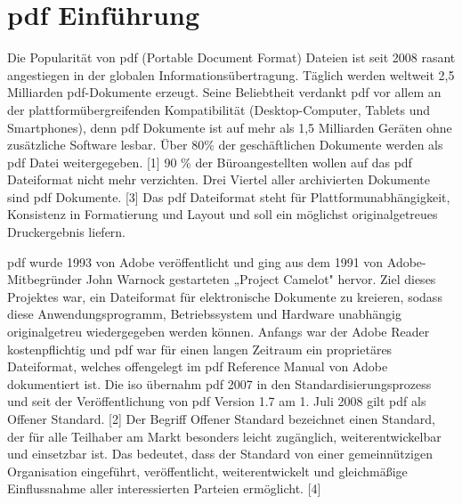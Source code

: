 \section{\gls{pdf} Einführung}
Die Popularität von \gls{pdf} (Portable Document Format) Dateien ist seit 2008 rasant angestiegen in der globalen Informationsübertragung. Täglich werden weltweit 2,5 Milliarden \gls{pdf}-Dokumente erzeugt. Seine Beliebtheit verdankt \gls{pdf} vor allem an der plattformübergreifenden Kompatibilität (Desktop-Computer, Tablets und Smartphones), denn \gls{pdf} Dokumente ist auf mehr als 1,5 Milliarden Geräten ohne zusätzliche Software lesbar. Über 80\% der geschäftlichen Dokumente werden als \gls{pdf} Datei weitergegeben. [1] 90 \% der Büroangestellten wollen auf das \gls{pdf} Dateiformat nicht mehr verzichten. Drei Viertel aller archivierten Dokumente sind \gls{pdf} Dokumente. [3] Das \gls{pdf} Dateiformat steht für Plattformunabhängigkeit, Konsistenz in Formatierung und Layout und soll ein möglichst originalgetreues Druckergebnis liefern.
\par
\gls{pdf} wurde 1993 von Adobe veröffentlicht und ging aus dem 1991 von Adobe-Mitbegründer John Warnock gestarteten „Project Camelot" hervor. Ziel dieses Projektes war, ein Dateiformat für elektronische Dokumente zu kreieren, sodass diese Anwendungsprogramm, Betriebssystem und Hardware unabhängig originalgetreu wiedergegeben werden können. Anfangs war der Adobe Reader kostenpflichtig und \gls{pdf} war für einen langen Zeitraum ein proprietäres Dateiformat, welches offengelegt im \gls{pdf} Reference Manual von Adobe dokumentiert ist. Die \gls{iso} übernahm \gls{pdf} 2007 in den Standardisierungsprozess und seit der Veröffentlichung von \gls{pdf} Version 1.7 am 1. Juli 2008 gilt \gls{pdf} als Offener Standard. [2] Der Begriff Offener Standard bezeichnet einen Standard, der für alle Teilhaber am Markt besonders leicht zugänglich, weiterentwickelbar und einsetzbar ist. Das bedeutet, dass der Standard von einer gemeinnützigen Organisation eingeführt, veröffentlicht, weiterentwickelt und gleichmäßige Einflussnahme aller interessierten Parteien ermöglicht. [4]
